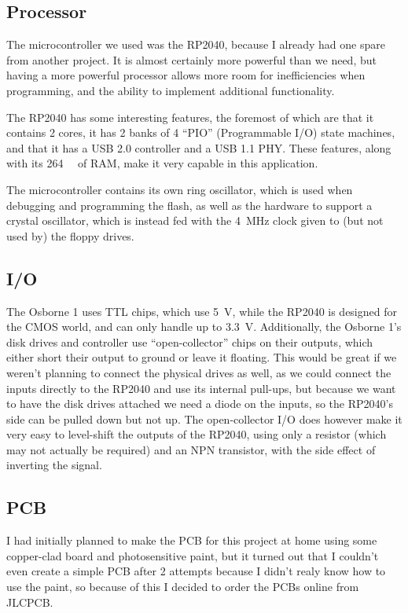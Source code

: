 \documentclass[a4paper]{article}
\begin{document}
\subsection{Processor}

The microcontroller we used was the RP2040, because I already had one spare
from another project. It is almost certainly more powerful than we
need, but having a more powerful processor allows more room for
inefficiencies when programming, and the ability to implement
additional functionality.

The RP2040 has some interesting features, the foremost of which are
that it contains 2 cores, it has 2 banks of 4 ``PIO'' (Programmable
I/O) state machines, and that it has a USB 2.0 controller and a USB
1.1 PHY. These features, along with its \qty{264}{\kibi\byte} of RAM, make it
very capable in this application.

The microcontroller contains its own ring oscillator, which is used when
debugging and programming the flash, as well as the hardware to
support a crystal oscillator, which is instead fed with the
\qty{4}{\MHz} clock given to (but not used by) the floppy drives.

\subsection{I/O}

The Osborne 1 uses TTL chips, which use \qty{5}{\V}, while the
RP2040 is designed for the CMOS world, and can only handle up to
\qty{3.3}{\V}. Additionally, the Osborne 1's disk drives and controller use
``open-collector'' chips on their outputs, which either short their
output to ground or leave it floating. This would be great if we
weren't planning to connect the physical drives as well, as we could
connect the inputs directly to the RP2040 and use its internal
pull-ups, but because we want to have the disk drives attached we need
a diode on the inputs, so the RP2040's side can be pulled down but not
up. The open-collector I/O does however make it very easy to
level-shift the outputs of the RP2040, using only a resistor (which
may not actually be required) and an NPN transistor, with the side
effect of inverting the signal.

\subsection{PCB}

I had initially planned to make the PCB for this project at home using
some copper-clad board and photosensitive paint, but it turned out
that I couldn't even create a simple PCB after 2 attempts because I
didn't realy know how to use the paint, so because of this I decided
to order the PCBs online from JLCPCB.
\end{document}
